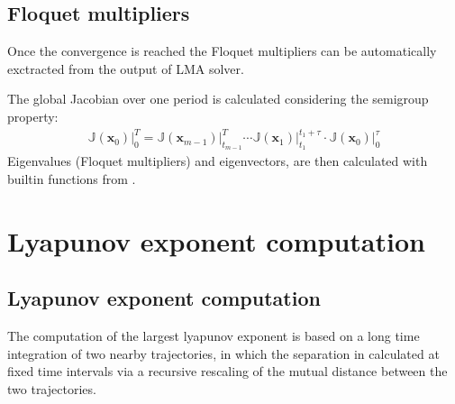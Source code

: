 \documentclass[letterpaper,10pt,english,openany,oneside]{sphinxmanual}
\begin{document}
\section{Floquet multipliers}
\label{\detokenize{multiple_shooting/floquet_multipliers:floquet-multipliers}}\label{\detokenize{multiple_shooting/floquet_multipliers::doc}}
Once the convergence is reached the Floquet multipliers can be automatically exctracted from the output of LMA solver.

The global Jacobian over one period is calculated considering the semi\sphinxhyphen{}group property:
\begin{equation}\label{equation:multiple_shooting/floquet_multipliers:jacobian_period}
\begin{split}\mathbb{J} (\mathbf{x}_0) \Big \rvert_{0}^{T} =    \mathbb{J} (\mathbf{x}_{m-1}) \Big \rvert_{t_{m-1}}^{T} \cdots  \mathbb{J} (\mathbf{x}_1) \Big \rvert_{t_{1}}^{t_{1}+\tau}\cdot \mathbb{J} (\mathbf{x}_0) \Big \rvert_{0}^{\tau}\end{split}
\end{equation}
Eigenvalues (Floquet multipliers) and eigenvectors, are then calculated with  builtin functions from .


\chapter{Lyapunov exponent computation}
\label{\detokenize{lyapunov_exponent/index:lyapunov-exponent-computation}}\label{\detokenize{lyapunov_exponent/index::doc}}

\section{Lyapunov exponent computation}
\label{\detokenize{lyapunov_exponent/lyapunov:lyapunov-exponent-computation}}\label{\detokenize{lyapunov_exponent/lyapunov::doc}}
The computation of the largest lyapunov exponent is based on a long time integration of two nearby trajectories, in which the separation in calculated at fixed time intervals via a recursive rescaling of the mutual distance between the two trajectories.

\begin{figure}[htbp]
\centering

\noindent{}
\end{figure}
\end{document}
